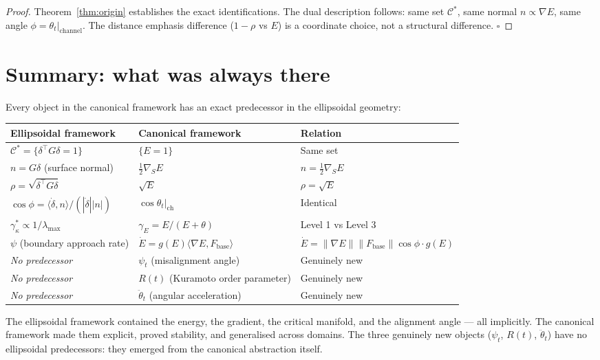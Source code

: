 \documentclass[11pt,a4paper,openany]{book}
\theoremstyle{definition}
\newcommand{\Fbase}{F_{\mathrm{base}}}
\begin{document}
\begin{proof}
Theorem~\ref{thm:origin} establishes the exact identifications.
The dual description follows: same set $\mathcal{C}^*$, same normal $n \propto \nabla E$,
same angle $\phi = \theta_t|_\mathrm{channel}$.
The distance emphasis difference ($1-\rho$ vs $E$) is a coordinate choice,
not a structural difference.
$\square$
\end{proof}

\section{Summary: what was always there}

Every object in the canonical framework has an exact predecessor in the
ellipsoidal geometry:

\begin{center}
\renewcommand{\arraystretch}{1.4}
\begin{tabular}{lll}
\toprule
\textbf{Ellipsoidal framework} & \textbf{Canonical framework} & \textbf{Relation} \\
\midrule
$\mathcal{C}^* = \{\delta^\top G\delta=1\}$ & $\{E=1\}$ & Same set \\
$n = G\delta$ (surface normal) & $\frac{1}{2}\nabla_S E$ & $n = \frac{1}{2}\nabla_S E$ \\
$\rho = \sqrt{\delta^\top G\delta}$ & $\sqrt{E}$ & $\rho = \sqrt{E}$ \\
$\cos\phi = \langle\dot\delta,n\rangle/(|\dot\delta||n|)$ & $\cos\theta_t|_\mathrm{ch}$ & Identical \\
$\gamma^*_\kappa \propto 1/\lambda_\mathrm{max}$ & $\gamma_E = E/(E+\theta)$ & Level 1 vs Level 3 \\
$\psi$ (boundary approach rate) & $\dot E = g(E)\langle\nabla E,\Fbase\rangle$ & $\dot E = \|\nabla E\|\|\Fbase\|\cos\phi \cdot g(E)$ \\
\midrule
\textit{No predecessor} & $\psi_t$ (misalignment angle) & Genuinely new \\
\textit{No predecessor} & $R(t)$ (Kuramoto order parameter) & Genuinely new \\
\textit{No predecessor} & $\ddot\theta_t$ (angular acceleration) & Genuinely new \\
\bottomrule
\end{tabular}
\end{center}

The ellipsoidal framework contained the energy, the gradient, the critical manifold,
and the alignment angle --- all implicitly.
The canonical framework made them explicit, proved stability, and generalised
across domains.
The three genuinely new objects ($\psi_t$, $R(t)$, $\ddot\theta_t$) have no
ellipsoidal predecessors: they emerged from the canonical abstraction itself.
\end{document}
